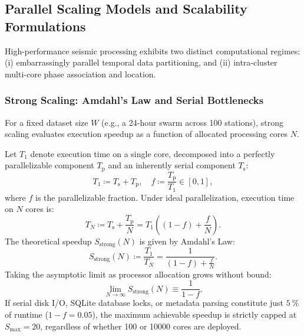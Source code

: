
\subsection*{Parallel Scaling Models and Scalability Formulations}
\label{subsec:supp_scaling_models}

High-performance seismic processing exhibits two distinct
computational regimes:
(i) embarrassingly parallel temporal data partitioning, and (ii) intra-cluster
multi-core phase association and location.

\subsubsection*{Strong Scaling: Amdahl's Law and Serial Bottlenecks}
For a fixed dataset size $W$ (e.g., a \num{24}-hour swarm across
\num{100} stations),
strong scaling evaluates execution speedup as a function of
allocated processing cores $N$.

Let $T_1$ denote execution time on a single core, decomposed into a
perfectly parallelizable
component $T_{\mathrm{p}}$ and an inherently serial component $T_{\mathrm{s}}$:
\begin{equation}
  T_1 \coloneqq T_{\mathrm{s}} + T_{\mathrm{p}}, \quad f \coloneqq
  \frac{T_{\mathrm{p}}}{T_1} \in [0, 1],
  \label{eq:supp_amdahl_decomposition}
\end{equation}
where $f$ is the parallelizable fraction. Under ideal
parallelization, execution time on $N$ cores is:
\begin{equation}
  T_N \coloneqq T_{\mathrm{s}} + \frac{T_{\mathrm{p}}}{N} = T_1
  \left( (1 - f) + \frac{f}{N} \right).
  \label{eq:supp_t_n}
\end{equation}
The theoretical speedup $S_{\mathrm{strong}}(N)$ is given by Amdahl's Law:
\begin{equation}
  S_{\mathrm{strong}}(N) \coloneqq \frac{T_1}{T_N} = \frac{1}{(1 -
  f) + \frac{f}{N}}.
  \label{eq:supp_amdahl_law}
\end{equation}
Taking the asymptotic limit as processor allocation grows without bound:
\begin{equation}
  \lim_{N \to \infty} S_{\mathrm{strong}}(N) \equiv \frac{1}{1 - f}.
  \label{eq:supp_amdahl_limit}
\end{equation}
If serial disk I/O, SQLite database locks, or metadata parsing
constitute just $\qty{5}{\percent}$
of runtime ($1 - f = \num{0.05}$), the maximum achievable speedup is
strictly capped at
$S_{\max} = \num{20}$, regardless of whether \num{100} or
\num{10000} cores are deployed.


